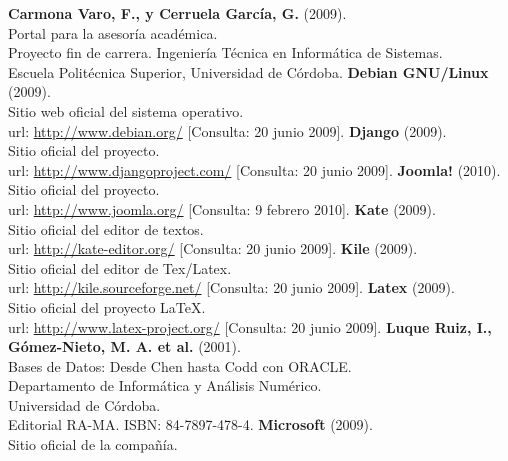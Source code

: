 \begin{thebibliography}{xx}

 \textbf{Carmona Varo, F., y Cerruela García, G.} (2009).\\
         Portal para la asesoría académica.\\
         Proyecto fin de carrera. Ingeniería Técnica en Informática de Sistemas.\\
         Escuela Politécnica Superior, Universidad de Córdoba.
 \textbf{Debian GNU/Linux} (2009).\\
         Sitio web oficial del sistema operativo.\\
         url: \url{http://www.debian.org/}
         [Consulta: 20 junio 2009].
 \textbf{Django} (2009).\\
         Sitio oficial del proyecto.\\
         url: \url{http://www.djangoproject.com/}
         [Consulta: 20 junio 2009].
 \textbf{Joomla!} (2010).\\
         Sitio oficial del proyecto.\\
         url: \url{http://www.joomla.org/}
         [Consulta: 9 febrero 2010].
 \textbf{Kate} (2009).\\
         Sitio oficial del editor de textos.\\
         url: \url{http://kate-editor.org/}
         [Consulta: 20 junio 2009].
 \textbf{Kile} (2009).\\
         Sitio oficial del editor de Tex/Latex.\\
         url: \url{http://kile.sourceforge.net/}
         [Consulta: 20 junio 2009].
 \textbf{Latex} (2009).\\
         Sitio oficial del proyecto \LaTeX.\\
         url: \url{http://www.latex-project.org/}
         [Consulta: 20 junio 2009].
 \textbf{Luque Ruiz, I., Gómez-Nieto, M. A. et al.} (2001).\\
         Bases de Datos: Desde Chen hasta Codd con ORACLE.\\
         Departamento de Informática y Análisis Numérico.\\
         Universidad de Córdoba.\\
         Editorial RA-MA. ISBN: 84-7897-478-4.
 \textbf{Microsoft} (2009).\\
         Sitio oficial de la compañía.\\

\end{thebibliography}
